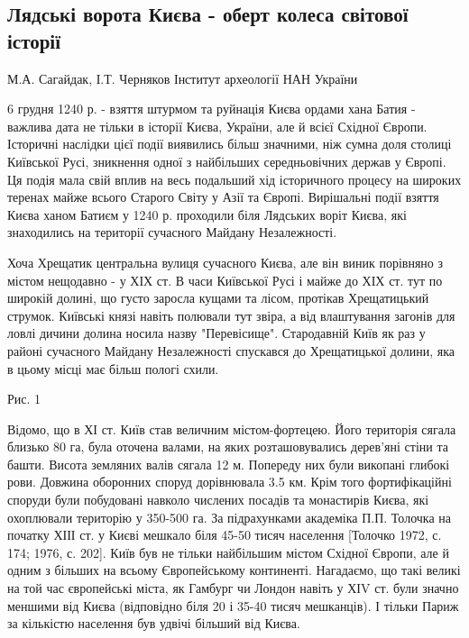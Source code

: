  
 

\subsection{Лядські ворота Києва - оберт колеса світової історії}

М.А. Сагайдак, І.Т. Черняков Інститут археології НАН України 

6 грудня 1240 р. - взяття штурмом та руйнація Києва ордами хана Батия -
важлива дата не тільки в історії Києва, України, але й всієї Східної Європи.
Історичні наслідки цієї події виявились більш значними, ніж сумна доля столиці
Київської Русі, зникнення одної з найбільших середньовічних держав у Європі.
Ця подія мала свій вплив на весь подальший хід історичного процесу на широких
теренах майже всього Старого Світу у Азії та Європі. Вирішальні події взяття
Києва ханом Батиєм у 1240 р. проходили біля Лядських воріт Києва, які
знаходились на території сучасного Майдану Незалежності.

Хоча Хрещатик центральна вулиця сучасного Києва, але він виник порівняно з
містом нещодавно - у ХІХ ст. В часи Київської Русі і майже до ХІХ ст. тут по
широкій долині, що густо заросла кущами та лісом, протікав Хрещатицький
струмок. Київські князі навіть полювали тут звіра, а від влаштування загонів
для ловлі дичини долина носила назву "Перевісище". Стародавній Київ як раз у
районі сучасного Майдану Незалежності спускався до Хрещатицької долини, яка в
цьому місці має більш пологі схили.

Рис. 1

Відомо, що в ХІ ст. Київ став величним містом-фортецею. Його територія сягала
близько 80 га, була оточена валами, на яких розташовувались дерев'яні стіни та
башти. Висота земляних валів сягала 12 м. Попереду них були викопані глибокі
рови. Довжина оборонних споруд дорівнювала 3.5 км. Крім того фортифікаційні
споруди були побудовані навколо числених посадів та монастирів Києва, які
охоплювали територію у 350-500 га. За підрахунками академіка П.П. Толочка на
початку ХІІІ ст. у Києві мешкало біля 45-50 тисяч населення [Толочко 1972, с.
174; 1976, с. 202]. Київ був не тільки найбільшим містом Східної Європи, але й
одним з більших на всьому Європейському континенті. Нагадаємо, що такі великі
на той час європейські міста, як Гамбург чи Лондон навіть у ХІV ст. були значно
меншими від Києва (відповідно біля 20 і 35-40 тисяч мешканців). І тільки Париж
за кількістю населення був удвічі більший від Києва.

